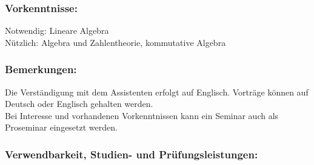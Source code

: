 \documentclass[a4paper,10pt]{article}
\begin{document}
\subsubsection*{\large
    Vorkenntnisse:
}
Notwendig: Lineare Algebra \\
Nützlich: Algebra und Zahlentheorie, kommutative Algebra
\subsubsection*{\large
    Bemerkungen:
}
Die Verständigung mit dem Assistenten erfolgt auf Englisch. Vorträge können auf Deutsch oder Englisch gehalten werden. \\
Bei Interesse und vorhandenen Vorkenntnissen kann ein Seminar auch als Proseminar eingesetzt werden.
\cleardoublepage
\subsubsection*{\large
    Verwendbarkeit, Studien- und Prüfungsleistungen:
}
\end{document}
